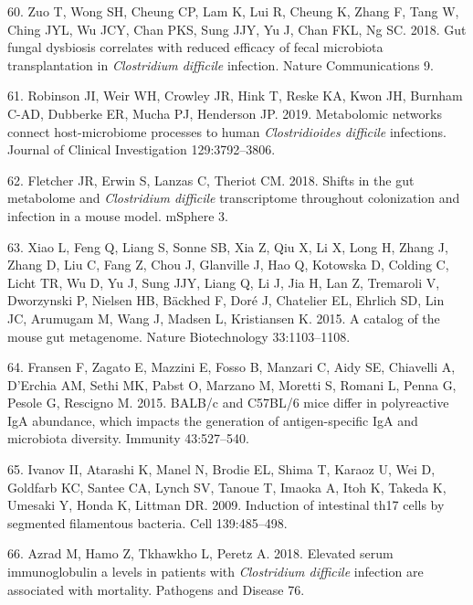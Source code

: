 \documentclass[
  11pt,
]{article}
\begin{document}
\leavevmode\hypertarget{ref-Zuo2018}{}%
60. Zuo T, Wong SH, Cheung CP, Lam K, Lui R, Cheung K, Zhang F, Tang W,
Ching JYL, Wu JCY, Chan PKS, Sung JJY, Yu J, Chan FKL, Ng SC. 2018. Gut
fungal dysbiosis correlates with reduced efficacy of fecal microbiota
transplantation in \emph{Clostridium difficile} infection. Nature
Communications 9.

\leavevmode\hypertarget{ref-Robinson2019}{}%
61. Robinson JI, Weir WH, Crowley JR, Hink T, Reske KA, Kwon JH, Burnham
C-AD, Dubberke ER, Mucha PJ, Henderson JP. 2019. Metabolomic networks
connect host-microbiome processes to human \emph{Clostridioides
difficile} infections. Journal of Clinical Investigation 129:3792--3806.

\leavevmode\hypertarget{ref-Fletcher2018}{}%
62. Fletcher JR, Erwin S, Lanzas C, Theriot CM. 2018. Shifts in the gut
metabolome and \emph{Clostridium difficile} transcriptome throughout
colonization and infection in a mouse model. mSphere 3.

\leavevmode\hypertarget{ref-Xiao2015}{}%
63. Xiao L, Feng Q, Liang S, Sonne SB, Xia Z, Qiu X, Li X, Long H, Zhang
J, Zhang D, Liu C, Fang Z, Chou J, Glanville J, Hao Q, Kotowska D,
Colding C, Licht TR, Wu D, Yu J, Sung JJY, Liang Q, Li J, Jia H, Lan Z,
Tremaroli V, Dworzynski P, Nielsen HB, Bäckhed F, Doré J, Chatelier EL,
Ehrlich SD, Lin JC, Arumugam M, Wang J, Madsen L, Kristiansen K. 2015. A
catalog of the mouse gut metagenome. Nature Biotechnology 33:1103--1108.

\leavevmode\hypertarget{ref-Fransen2015}{}%
64. Fransen F, Zagato E, Mazzini E, Fosso B, Manzari C, Aidy SE,
Chiavelli A, D'Erchia AM, Sethi MK, Pabst O, Marzano M, Moretti S,
Romani L, Penna G, Pesole G, Rescigno M. 2015. BALB/c and C57BL/6 mice
differ in polyreactive IgA abundance, which impacts the generation of
antigen-specific IgA and microbiota diversity. Immunity 43:527--540.

\leavevmode\hypertarget{ref-Ivanov2009}{}%
65. Ivanov II, Atarashi K, Manel N, Brodie EL, Shima T, Karaoz U, Wei D,
Goldfarb KC, Santee CA, Lynch SV, Tanoue T, Imaoka A, Itoh K, Takeda K,
Umesaki Y, Honda K, Littman DR. 2009. Induction of intestinal th17 cells
by segmented filamentous bacteria. Cell 139:485--498.

\leavevmode\hypertarget{ref-Azrad2018}{}%
66. Azrad M, Hamo Z, Tkhawkho L, Peretz A. 2018. Elevated serum
immunoglobulin a levels in patients with \emph{Clostridium difficile}
infection are associated with mortality. Pathogens and Disease 76.
\end{document}
